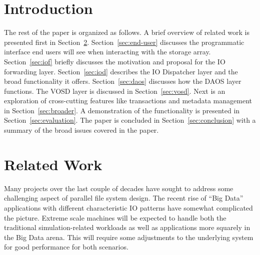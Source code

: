 \documentclass{sig-alt-gov2}
\begin{document}


\section{Introduction}


The rest of the paper is organized as follows. A brief overview of related work
is presented first in Section~\ref{sec:related}. Section~\ref{sec:end-user}
discusses the programmatic interface end users will see when interacting with
the storage array.
Section~\ref{sec:iof}
briefly discusses the motivation and proposal for the IO forwarding layer.
Section~\ref{sec:iod} describes the IO Dispatcher layer and the broad
functionality it offers.
Section~\ref{sec:daos} discusses how the DAOS
layer functions.
The VOSD layer is discussed in Section~\ref{sec:vosd}.
Next is an exploration of cross-cutting features like transactions and
metadata management in Section~\ref{sec:broader}.
A demonstration of the functionality is presented in
Section~\ref{sec:evaluation}.
The paper is concluded in
Section~\ref{sec:conclusion} with a summary of the broad issues covered in the
paper.

\section{Related Work}
\label{sec:related}

Many projects over the last couple of decades have sought to address some
challenging aspect of parallel file system design. The recent rise of ``Big
Data'' applications with different characteristic IO patterns have somewhat
complicated the picture. Extreme scale machines will be expected to handle both
the traditional simulation-related workloads as well as applications more
squarely in the Big Data arena. This will require some adjustments to the
underlying system for good performance for both scenarios.
\end{document}

